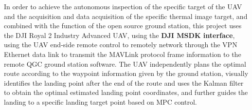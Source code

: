 \begin{enabstract}
In order to achieve the autonomous inspection of the specific target of the UAV and the acquisition and data acquisition of the specific thermal image target, and combined with the function of the open source ground station, this project uses the DJI Royal 2 Industry Advanced UAV, using the \textbf{DJI MSDK interface}, using the UAV end-side remote control to remotely network through the VPN Ethernet data link to transmit the MAVLink protocol frame information to the remote QGC ground station software. The UAV independently plans the optimal route according to the waypoint information given by the ground station, visually identifies the landing point after the end of the route and uses the Kalman filter to obtain the optimal estimated landing point coordinates, and further guides the landing to a specific landing target point based on MPC control.

\end{enabstract}
